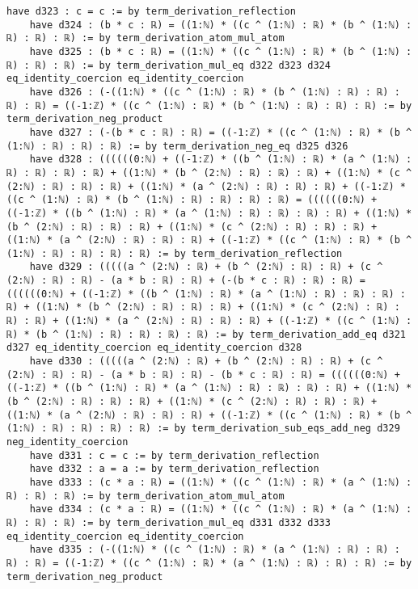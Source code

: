 \documentclass{article}
\begin{document}
\begin{tcolorbox}[colback=white!10, width=\linewidth]
\begin{lstlisting}[language=Lean4]
    have d323 : c = c := by term_derivation_reflection
    have d324 : (b * c : ℝ) = ((1:ℕ) * ((c ^ (1:ℕ) : ℝ) * (b ^ (1:ℕ) : ℝ) : ℝ) : ℝ) := by term_derivation_atom_mul_atom
    have d325 : (b * c : ℝ) = ((1:ℕ) * ((c ^ (1:ℕ) : ℝ) * (b ^ (1:ℕ) : ℝ) : ℝ) : ℝ) := by term_derivation_mul_eq d322 d323 d324 eq_identity_coercion eq_identity_coercion
    have d326 : (-((1:ℕ) * ((c ^ (1:ℕ) : ℝ) * (b ^ (1:ℕ) : ℝ) : ℝ) : ℝ) : ℝ) = ((-1:ℤ) * ((c ^ (1:ℕ) : ℝ) * (b ^ (1:ℕ) : ℝ) : ℝ) : ℝ) := by term_derivation_neg_product
    have d327 : (-(b * c : ℝ) : ℝ) = ((-1:ℤ) * ((c ^ (1:ℕ) : ℝ) * (b ^ (1:ℕ) : ℝ) : ℝ) : ℝ) := by term_derivation_neg_eq d325 d326
    have d328 : ((((((0:ℕ) + ((-1:ℤ) * ((b ^ (1:ℕ) : ℝ) * (a ^ (1:ℕ) : ℝ) : ℝ) : ℝ) : ℝ) + ((1:ℕ) * (b ^ (2:ℕ) : ℝ) : ℝ) : ℝ) + ((1:ℕ) * (c ^ (2:ℕ) : ℝ) : ℝ) : ℝ) + ((1:ℕ) * (a ^ (2:ℕ) : ℝ) : ℝ) : ℝ) + ((-1:ℤ) * ((c ^ (1:ℕ) : ℝ) * (b ^ (1:ℕ) : ℝ) : ℝ) : ℝ) : ℝ) = ((((((0:ℕ) + ((-1:ℤ) * ((b ^ (1:ℕ) : ℝ) * (a ^ (1:ℕ) : ℝ) : ℝ) : ℝ) : ℝ) + ((1:ℕ) * (b ^ (2:ℕ) : ℝ) : ℝ) : ℝ) + ((1:ℕ) * (c ^ (2:ℕ) : ℝ) : ℝ) : ℝ) + ((1:ℕ) * (a ^ (2:ℕ) : ℝ) : ℝ) : ℝ) + ((-1:ℤ) * ((c ^ (1:ℕ) : ℝ) * (b ^ (1:ℕ) : ℝ) : ℝ) : ℝ) : ℝ) := by term_derivation_reflection
    have d329 : (((((a ^ (2:ℕ) : ℝ) + (b ^ (2:ℕ) : ℝ) : ℝ) + (c ^ (2:ℕ) : ℝ) : ℝ) - (a * b : ℝ) : ℝ) + (-(b * c : ℝ) : ℝ) : ℝ) = ((((((0:ℕ) + ((-1:ℤ) * ((b ^ (1:ℕ) : ℝ) * (a ^ (1:ℕ) : ℝ) : ℝ) : ℝ) : ℝ) + ((1:ℕ) * (b ^ (2:ℕ) : ℝ) : ℝ) : ℝ) + ((1:ℕ) * (c ^ (2:ℕ) : ℝ) : ℝ) : ℝ) + ((1:ℕ) * (a ^ (2:ℕ) : ℝ) : ℝ) : ℝ) + ((-1:ℤ) * ((c ^ (1:ℕ) : ℝ) * (b ^ (1:ℕ) : ℝ) : ℝ) : ℝ) : ℝ) := by term_derivation_add_eq d321 d327 eq_identity_coercion eq_identity_coercion d328
    have d330 : (((((a ^ (2:ℕ) : ℝ) + (b ^ (2:ℕ) : ℝ) : ℝ) + (c ^ (2:ℕ) : ℝ) : ℝ) - (a * b : ℝ) : ℝ) - (b * c : ℝ) : ℝ) = ((((((0:ℕ) + ((-1:ℤ) * ((b ^ (1:ℕ) : ℝ) * (a ^ (1:ℕ) : ℝ) : ℝ) : ℝ) : ℝ) + ((1:ℕ) * (b ^ (2:ℕ) : ℝ) : ℝ) : ℝ) + ((1:ℕ) * (c ^ (2:ℕ) : ℝ) : ℝ) : ℝ) + ((1:ℕ) * (a ^ (2:ℕ) : ℝ) : ℝ) : ℝ) + ((-1:ℤ) * ((c ^ (1:ℕ) : ℝ) * (b ^ (1:ℕ) : ℝ) : ℝ) : ℝ) : ℝ) := by term_derivation_sub_eqs_add_neg d329 neg_identity_coercion
    have d331 : c = c := by term_derivation_reflection
    have d332 : a = a := by term_derivation_reflection
    have d333 : (c * a : ℝ) = ((1:ℕ) * ((c ^ (1:ℕ) : ℝ) * (a ^ (1:ℕ) : ℝ) : ℝ) : ℝ) := by term_derivation_atom_mul_atom
    have d334 : (c * a : ℝ) = ((1:ℕ) * ((c ^ (1:ℕ) : ℝ) * (a ^ (1:ℕ) : ℝ) : ℝ) : ℝ) := by term_derivation_mul_eq d331 d332 d333 eq_identity_coercion eq_identity_coercion
    have d335 : (-((1:ℕ) * ((c ^ (1:ℕ) : ℝ) * (a ^ (1:ℕ) : ℝ) : ℝ) : ℝ) : ℝ) = ((-1:ℤ) * ((c ^ (1:ℕ) : ℝ) * (a ^ (1:ℕ) : ℝ) : ℝ) : ℝ) := by term_derivation_neg_product

\end{lstlisting}
\end{tcolorbox}
\end{document}
